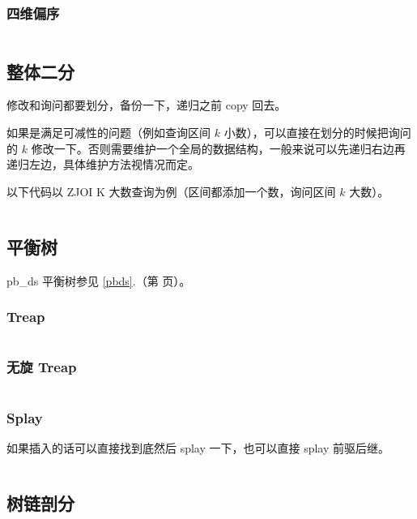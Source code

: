 \documentclass[a4paper, twoside]{article}
\newcommand\detailedref[1]{\ref{#1}.\nameref{#1}（第 \pageref{#1} 页）}
\begin{document}
\begin{multicols}{2}
				\subsubsection{四维偏序}
					\inputminted{cpp}{../src/datastructure/CDQ分治.cpp}
	
			\subsection{整体二分}
				修改和询问都要划分，备份一下，递归之前 copy 回去。

				如果是满足可减性的问题（例如查询区间 $k$ 小数），可以直接在划分的时候把询问的 $k$ 修改一下。否则需要维护一个全局的数据结构，一般来说可以先递归右边再递归左边，具体维护方法视情况而定。

				以下代码以 ZJOI K 大数查询为例（区间都添加一个数，询问区间 $k$ 大数）。

				\inputminted{cpp}{../src/datastructure/整体二分.cpp}

	
	
			\subsection{平衡树}
				pb\_ds 平衡树参见 \detailedref{pbds}。

				\subsubsection{Treap}
					\inputminted{cpp}{../src/datastructure/Treap.cpp}
					
				\subsubsection[无旋 Treap / 可持久化 Treap]{无旋 Treap}
					\inputminted{cpp}{../src/datastructure/无旋Treap.cpp}
		
				\subsubsection{Splay}
					如果插入的话可以直接找到底然后 splay 一下，也可以直接 splay 前驱后继。
					\inputminted{cpp}{../src/datastructure/文艺平衡树.cpp}
				
			\subsection{树链剖分}

\end{multicols}
\end{document}
